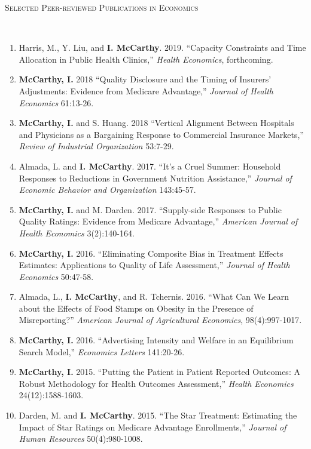 \documentclass[9pt]{article}
\newenvironment{changemargin}[2]{%
  \begin{list}{}{%
    \setlength{\topsep}{0pt}%
    \setlength{\leftmargin}{#1}%
    \setlength{\rightmargin}{#2}%
    \setlength{\listparindent}{\parindent}%
    \setlength{\itemindent}{\parindent}%
    \setlength{\parsep}{\parskip}%
  }%
  \item[]}{\end{list}
}
\newcommand{\lineover}{
	\begin{changemargin}{-0.05in}{-0.05in}
		\vspace*{-8pt}
		\hrulefill \\
		\vspace*{-2pt}
	\end{changemargin}
}
\newcommand{\header}[1]{
	\begin{changemargin}{-0.5in}{-0.5in}
	\scshape{#1}\\
  	\lineover
	\end{changemargin}
}
\newenvironment{body} {
	\vspace*{-16pt}
	\begin{changemargin}{-0.25in}{-0.5in}
  }	
	{\end{changemargin}
}
\begin{document}
\header{Selected Peer-reviewed Publications in Economics}
\begin{body}
  \vspace{13pt}
  \begin{enumerate}
    \item Harris, M., Y. Liu, and \textbf{I. McCarthy}. 2019. ``Capacity Constraints and Time Allocation in Public Health Clinics,'' \textit{Health Economics}, forthcoming.  
    \item \textbf{McCarthy, I.} 2018 ``Quality Disclosure and the Timing of Insurers' Adjustments: Evidence from Medicare Advantage,'' \textit{Journal of Health Economics} 61:13-26.
    \item \textbf{McCarthy, I.} and S. Huang. 2018 ``Vertical Alignment Between Hospitals and Physicians as a Bargaining Response to Commercial Insurance Markets,'' \textit{Review of Industrial Organization} 53:7-29.
    \item Almada, L. and \textbf{I. McCarthy}. 2017. ``It's a Cruel Summer: Household Responses to Reductions in Government Nutrition Assistance,'' \textit{Journal of Economic Behavior and Organization} 143:45-57.
    \item \textbf{McCarthy, I.} and M. Darden. 2017. ``Supply-side Responses to Public Quality Ratings: Evidence from Medicare Advantage,'' \textit{American Journal of Health Economics} 3(2):140-164.
    \item \textbf{McCarthy, I.} 2016. ``Eliminating Composite Bias in Treatment Effects Estimates: Applications to Quality of Life Assessment,'' \textit{Journal of Health Economics} 50:47-58.
    \item Almada, L., \textbf{I. McCarthy}, and R. Tchernis. 2016. ``What Can We Learn about the Effects of Food Stamps on Obesity in the Presence of Misreporting?'' \textit{American Journal of Agricultural Economics}, 98(4):997-1017. \\
    \item \textbf{McCarthy, I.} 2016. ``Advertising Intensity and Welfare in an Equilibrium Search Model,'' \textit{Economics Letters} 141:20-26.
    \item \textbf{McCarthy, I.} 2015. ``Putting the Patient in Patient Reported Outcomes: A Robust Methodology for Health Outcomes Assessment,'' \textit{Health Economics} 24(12):1588-1603.
    \item Darden, M. and \textbf{I. McCarthy}. 2015. ``The Star Treatment: Estimating the Impact of Star Ratings on Medicare Advantage Enrollments,'' \textit{Journal of Human Resources} 50(4):980-1008.
  \end{enumerate}
\end{body}
\smallskip
\end{document}
